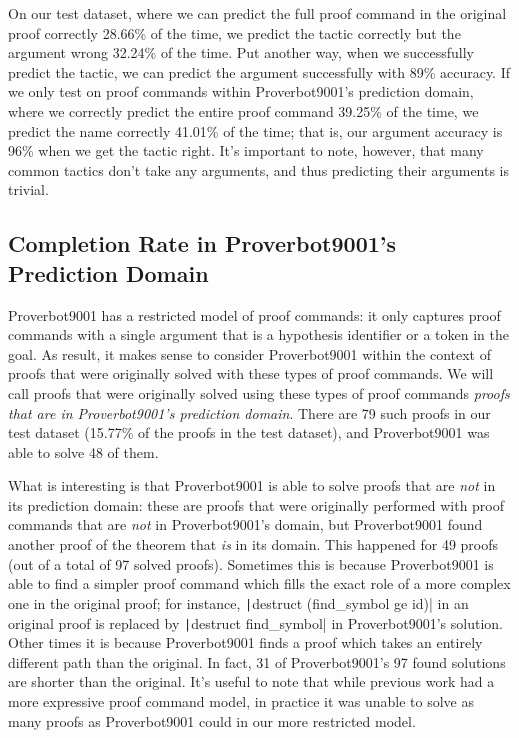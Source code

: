 \documentclass[sigplan,screen]{acmart}
\newcommand{\name}{Proverbot9001\xspace}
\newcommand{\coqinline}[1]{\texttt|#1|}
\renewcommand{\>}{\quad}
\begin{document}
On our test dataset,
  where we can predict the full proof command in the original proof correctly
  28.66\% of the time,
  we predict the tactic correctly but the argument wrong
  32.24\% of the time.
Put another way,
  when we successfully predict the tactic,
  we can predict the argument successfully with 89\% accuracy.
If we only test on proof commands within \name{}'s prediction domain,
  where we correctly predict the entire proof command 39.25\% of the time,
  we predict the name correctly 41.01\% of the time;
  that is, our argument accuracy is 96\% when we get the tactic right.
It's important to note, however, that many common tactics don't take any arguments,
  and thus predicting their arguments is trivial.

\subsection{Completion Rate in \name{}'s Prediction Domain}

\name{} has a restricted model of proof commands:
  it only captures proof commands with a single argument that is a hypothesis identifier or a token in the goal.
As result,
  it makes sense to consider \name{} within the context of proofs that
  were originally solved with these types of proof commands.
We will call proofs that were originally solved using these types of proof commands \emph{proofs that are in \name{}'s prediction domain}.
There are 79 such proofs in our test dataset (15.77\% of the proofs in the test dataset), and \name{} was able to solve 48 of them.

What is interesting
  is that \name{} is able to solve proofs that are \emph{not} in its prediction domain:
  these are proofs that were originally performed
  with proof commands that are \emph{not} in \name{}'s domain,
  but \name{} found another proof of the theorem
  that \emph{is} in its domain.
This happened for 49 proofs (out of a total of 97 solved proofs).
Sometimes this is because \name{} is able to find a simpler proof command which
  fills the exact role of a more complex one in the original proof;
  for instance, \coqinline{destruct (find_symbol ge id)} in an original proof
  is replaced by \coqinline{destruct find_symbol} in \name{}'s solution.
Other times it is because \name{} finds a proof
  which takes an entirely different path than the original. In fact,
  31 of \name{}'s 97 found solutions are shorter than the original.
It's useful to note that while previous work had a more expressive proof command model,
  in practice it was unable to solve as many proofs
  as \name{} could in our more restricted model.
\end{document}
